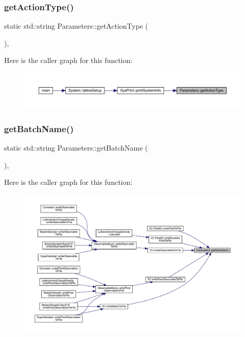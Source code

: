 \subsubsection{\texorpdfstring{getActionType()}{getActionType()}}
{\footnotesize\ttfamily static std\+::string Parameters\+::get\+Action\+Type (\begin{DoxyParamCaption}{ }\end{DoxyParamCaption})\hspace{0.3cm}{\ttfamily [inline]}, {\ttfamily [static]}}

Here is the caller graph for this function\+:\nopagebreak
\begin{figure}[H]
\begin{center}
\leavevmode
\includegraphics[width=350pt]{class_parameters_afc824aec2ab48afe06829050d0fbe966_icgraph}
\end{center}
\end{figure}
\mbox{\label{class_parameters_a181a773d23fdb19d0c4f35e6cf2d5649}} 
\subsubsection{\texorpdfstring{getBatchName()}{getBatchName()}}
{\footnotesize\ttfamily static std\+::string Parameters\+::get\+Batch\+Name (\begin{DoxyParamCaption}{ }\end{DoxyParamCaption})\hspace{0.3cm}{\ttfamily [inline]}, {\ttfamily [static]}}

Here is the caller graph for this function\+:\nopagebreak
\begin{figure}[H]
\begin{center}
\leavevmode
\includegraphics[width=350pt]{class_parameters_a181a773d23fdb19d0c4f35e6cf2d5649_icgraph}
\end{center}
\end{figure}
\mbox{\label{class_parameters_ae5c64523dc50dca13b417fe3d9e4175c}} 
